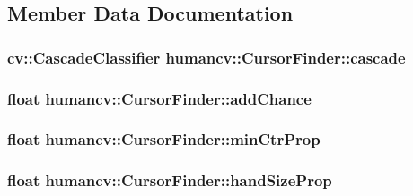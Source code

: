 \subsection{Member Data Documentation}
\hypertarget{classhumancv_1_1_cursor_finder_a5dd2e09ff9ca7e0667d0267d571a31ff}{
\subsubsection[{cascade}]{\setlength{\rightskip}{0pt plus 5cm}cv\-::\-Cascade\-Classifier {\bf humancv\-::\-Cursor\-Finder\-::cascade}}}\label{classhumancv_1_1_cursor_finder_a5dd2e09ff9ca7e0667d0267d571a31ff}
\hypertarget{classhumancv_1_1_cursor_finder_ad7607c9dd807d16db9cda9cea42e8dcb}{
\subsubsection[{add\-Chance}]{\setlength{\rightskip}{0pt plus 5cm}float {\bf humancv\-::\-Cursor\-Finder\-::add\-Chance}}}\label{classhumancv_1_1_cursor_finder_ad7607c9dd807d16db9cda9cea42e8dcb}
\hypertarget{classhumancv_1_1_cursor_finder_aefec5ff071032bfce5d46c4cdedf3f10}{
\subsubsection[{min\-Ctr\-Prop}]{\setlength{\rightskip}{0pt plus 5cm}float {\bf humancv\-::\-Cursor\-Finder\-::min\-Ctr\-Prop}}}\label{classhumancv_1_1_cursor_finder_aefec5ff071032bfce5d46c4cdedf3f10}
\hypertarget{classhumancv_1_1_cursor_finder_a647e0325a998393648793c069524454d}{
\subsubsection[{hand\-Size\-Prop}]{\setlength{\rightskip}{0pt plus 5cm}float {\bf humancv\-::\-Cursor\-Finder\-::hand\-Size\-Prop}}}\label{classhumancv_1_1_cursor_finder_a647e0325a998393648793c069524454d}
